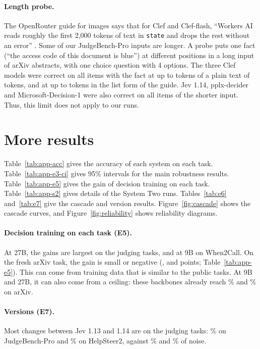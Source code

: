 \documentclass[11pt]{article}
\begin{document}
\paragraph{Length probe.} The OpenRouter guide for images says that for Clef and Clef-flash, ``Workers AI reads roughly the first 2,000 tokens of text in \texttt{state} and drops the rest without an error'' \citep{openrouter2026multimodal}. Some of our JudgeBench-Pro inputs are longer. A probe puts one fact (``the access code of this document is blue'') at different positions in a long input of arXiv abstracts, with one choice question with 4 options. The three Clef models were correct on all items with the fact at up to \probeLongMax{} tokens of a plain text of \probeLongInput{} tokens, and at up to \probeArrayMax{} tokens in the list form of the guide. Jev 1.14, pplx-decider and Microsoft-Decision-1 were also correct on all items of the shorter input. Thus, this limit does not apply to our runs.

\section{More results}
\label{app:results}

Table~\ref{tab:app-acc} gives the accuracy of each system on each task. Table~\ref{tab:app-e3-ci} gives 95\% intervals for the main robustness results. Table~\ref{tab:app-e5} gives the gain of decision training on each task. Table~\ref{tab:app-s2} gives details of the System Two runs. Tables~\ref{tab:e6} and~\ref{tab:e7} give the cascade and version results. Figure~\ref{fig:cascade} shows the cascade curves, and Figure~\ref{fig:reliability} shows reliability diagrams.

\paragraph{Decision training on each task (E5).} At 27B, the gains are largest on the judging tasks, and at 9B on When2Call. On the fresh arXiv task, the gain is small or negative (\arxivGainFour, \arxivGainNine{} and \arxivGainTwentySeven{} points; Table~\ref{tab:app-e5}). This can come from training data that is similar to the public tasks. At 9B and 27B, it can also come from a ceiling: these backbones already reach \arxivBaseNine\% and \arxivBaseTwentySeven\% on arXiv.

\paragraph{Versions (E7).} Most changes between Jev 1.13 and 1.14 are on the judging tasks: \flipVersionJudgebench\% on JudgeBench-Pro and \flipVersionHelpsteer\% on HelpSteer2, against \flipNoiseJudgebench\% and \flipNoiseHelpsteer\% of noise.
\end{document}
